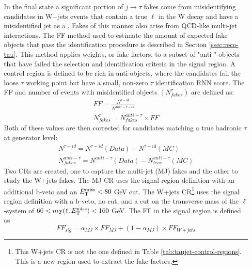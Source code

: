 		In the \taulep final state a significant portion of $j \to \tau$ fakes come from misidentifying \tauhad candidates in W+jets events that contain a true $\ell$ in the W decay and have a misidentified jet as a \tauhad. Fakes of this manner also arise from \acrshort{QCD}-like multi-jet interactions. The \gls{FF} method used to estimate the amount of expected fake \tauhad objects that pass the \tauhad identification procedure is described in Section \ref{ssec:reco-tau}. This method applies weights, or fake factors, to a subset of "anti-\tauhad" objects that have failed the selection and identification criteria in the signal region. A control region is defined to be rich in anti-\tauhad objects, where the \tauhad candidates fail the loose $\tau$ working point but have a small, non-zero $\tau$ identification \gls{RNN} score. The \gls{FF} and number of events with misidentified \tauhad objects $(N^{\tau}_{fakes})$ are defined as:
		\begin{equation}\label{eqn:ff}\begin{split}
		FF = \frac{ N^{\tau-id} }{N^{anti-\tau-id}} \\
		N_{fakes}^{\tau} = N^{anti-\tau}_{fakes} \times FF
		\end{split}\end{equation}
		Both of these values are then corrected for \tauhad candidates matching a true hadronic $\tau$ at generator level:
		\begin{equation}\label{eqn:ff-corrected}\begin{split}
		N^{\tau-id} = N^{\tau-id}(Data) - N^{\tau-id}(MC) \\
		N^{anti-\tau}_{fakes} = N^{anti-\tau}(Data) - N^{anti-\tau}_{true} (MC)
		\end{split}\end{equation}
		Two \glspl{CR} are created, one to capture the multi-jet (MJ) fakes and the other to study the W+jets fakes. The MJ \gls{CR} uses the \taujets signal region definition with an additional b-veto and an $E_\text{T}^\text{miss} < 80$ GeV cut. The W+jets \gls{CR}\footnote{This W+jets \gls{CR} is not the one defined in Table \ref{tab:taujet-control-regions}. This is a new region used to extract the fake factors.} uses the \taulep signal region definition with a b-veto, no \Etm cut, and a cut on the transverse mass of the $\ell$-\Etm system of $60 < m_{T}(\ell, E_\text{T}^\text{miss})<160$ GeV.
		The \gls{FF} in the signal region is defined as 
		\begin{equation}\label{eqn:ff-sig}
		FF_{sig} = \alpha_{MJ} \times FF_{MJ} + (1 - \alpha_{MJ}) \times FF_{W+jets}
		\end{equation}
